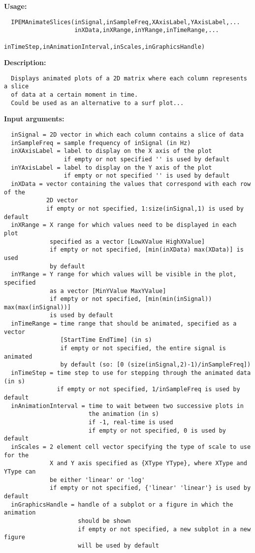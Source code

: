 \textbf{Usage:}
\begin{verbatim}  IPEMAnimateSlices(inSignal,inSampleFreq,XAxisLabel,YAxisLabel,...
                    inXData,inXRange,inYRange,inTimeRange,...
                    inTimeStep,inAnimationInterval,inScales,inGraphicsHandle)

\end{verbatim}
\textbf{Description:}
\begin{verbatim}  Displays animated plots of a 2D matrix where each column represents a slice
  of data at a certain moment in time.
  Could be used as an alternative to a surf plot...

\end{verbatim}
\textbf{Input arguments:}
\begin{verbatim}  inSignal = 2D vector in which each column contains a slice of data
  inSampleFreq = sample frequency of inSignal (in Hz)
  inXAxisLabel = label to display on the X axis of the plot
                 if empty or not specified '' is used by default
  inYAxisLabel = label to display on the Y axis of the plot
                 if empty or not specified '' is used by default
  inXData = vector containing the values that correspond with each row of the
            2D vector
            if empty or not specified, 1:size(inSignal,1) is used by default
  inXRange = X range for which values need to be displayed in each plot
             specified as a vector [LowXValue HighXValue]
             if empty or not specified, [min(inXData) max(XData)] is used
             by default
  inYRange = Y range for which values will be visible in the plot, specified
             as a vector [MinYValue MaxYValue]
             if empty or not specified, [min(min(inSignal)) max(max(inSignal))]
             is used by default
  inTimeRange = time range that should be animated, specified as a vector
                [StartTime EndTime] (in s)
                if empty or not specified, the entire signal is animated
                by default (so: [0 (size(inSignal,2)-1)/inSampleFreq])
  inTimeStep = time step to use for stepping through the animated data (in s)
               if empty or not specified, 1/inSampleFreq is used by default
  inAnimationInterval = time to wait between two successive plots in
                        the animation (in s)
                        if -1, real-time is used
                        if empty or not specified, 0 is used by default
  inScales = 2 element cell vector specifying the type of scale to use for the
             X and Y axis specified as {XType YType}, where XType and YType can
             be either 'linear' or 'log'
             if empty or not specified, {'linear' 'linear'} is used by default
  inGraphicsHandle = handle of a subplot or a figure in which the animation
                     should be shown
                     if empty or not specified, a new subplot in a new figure
                     will be used by default

\end{verbatim}
